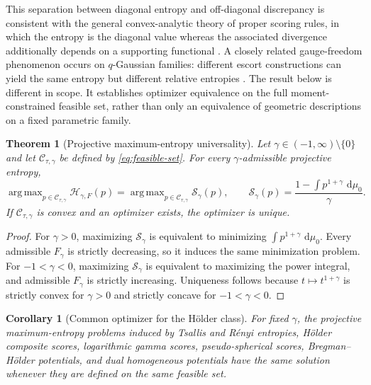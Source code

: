 \documentclass[pdflatex,sn-mathphys-num]{sn-jnl}
\theoremstyle{thmstyleone}
\newtheorem{theorem}{Theorem}
\newtheorem{corollary}{Corollary}
\theoremstyle{thmstyletwo}
\theoremstyle{thmstylethree}
\DeclareMathOperator*{\argmax}{arg\,max}
\newcommand{\dd}{\,\mathrm{d}}
\newcommand{\calC}{\mathcal{C}}
\newcommand{\calS}{\mathcal{S}}
\newcommand{\calH}{\mathcal{H}}
\begin{document}
This separation between diagonal entropy and off-diagonal discrepancy is consistent with the general convex-analytic theory of proper scoring rules, in which the entropy is the diagonal value whereas the associated divergence additionally depends on a supporting functional \citep{Ovcharov2018}. A closely related gauge-freedom phenomenon occurs on $q$-Gaussian families: different escort constructions can yield the same entropy but different relative entropies \citep{MatsuzoeTakatsu2021}. The result below is different in scope. It establishes optimizer equivalence on the full moment-constrained feasible set, rather than only an equivalence of geometric descriptions on a fixed parametric family.


\begin{theorem}[Projective maximum-entropy universality]\label{thm:universality}
Let $\gamma\in(-1,\infty)\setminus\{0\}$ and let $\calC_{\tau,\gamma}$ be defined by \cref{eq:feasible-set}. For every $\gamma$-admissible projective entropy,
\begin{equation}
 \argmax_{p\in\calC_{\tau,\gamma}}
 \calH_{\gamma,F}(p)
 =
 \argmax_{p\in\calC_{\tau,\gamma}}
 \calS_\gamma(p),
 \qquad
 \calS_\gamma(p)=\frac{1-\int p^{1+\gamma}\,\dd\mu_0}{\gamma}.
\label{eq:universality-argmax}
\end{equation}
If $\calC_{\tau,\gamma}$ is convex and an optimizer exists, the optimizer is unique.
\end{theorem}

\begin{proof}
For $\gamma>0$, maximizing $\calS_\gamma$ is equivalent to minimizing $\int p^{1+\gamma}\,\dd\mu_0$. Every admissible $F_\gamma$ is strictly decreasing, so it induces the same minimization problem. For $-1<\gamma<0$, maximizing $\calS_\gamma$ is equivalent to maximizing the power integral, and admissible $F_\gamma$ is strictly increasing. Uniqueness follows because $t\mapsto t^{1+\gamma}$ is strictly convex for $\gamma>0$ and strictly concave for $-1<\gamma<0$.
\end{proof}

\begin{corollary}[Common optimizer for the H\"older class]\label{cor:holder-universality}
For fixed $\gamma$, the projective maximum-entropy problems induced by Tsallis and R\'enyi entropies, H\"older composite scores, logarithmic gamma scores, pseudo-spherical scores, Bregman--H\"older potentials, and dual homogeneous potentials have the same solution whenever they are defined on the same feasible set.
\end{corollary}
\end{document}
